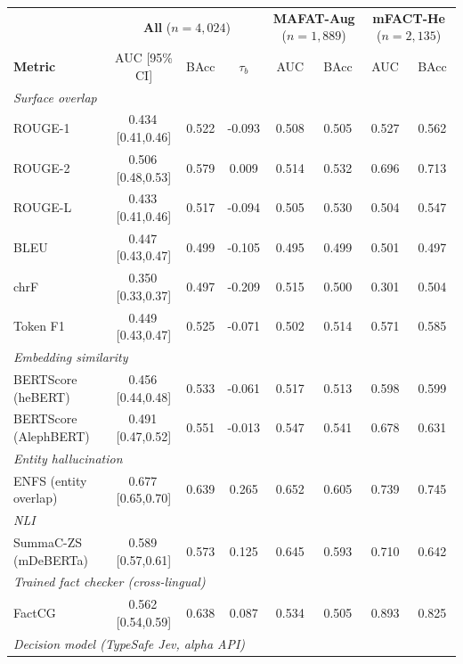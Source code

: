 \begin{table}[t]
\centering
\small
\setlength{\tabcolsep}{5pt}
\begin{tabular}{lccc|cc|cc}
\toprule
 & \multicolumn{3}{c|}{\textbf{All} ($n{=}4{,}024$)} & \multicolumn{2}{c|}{\textbf{MAFAT-Aug} ($n{=}1{,}889$)} & \multicolumn{2}{c}{\textbf{mFACT-He} ($n{=}2{,}135$)} \\
\textbf{Metric} & AUC [95\% CI] & BAcc & $\tau_b$ & AUC & BAcc & AUC & BAcc \\
\midrule
\multicolumn{8}{l}{\textit{Surface overlap}} \\
ROUGE-1 & 0.434\,{\scriptsize[0.41,0.46]} & 0.522 & -0.093 & 0.508 & 0.505 & 0.527 & 0.562 \\
ROUGE-2 & 0.506\,{\scriptsize[0.48,0.53]} & 0.579 & 0.009 & 0.514 & 0.532 & 0.696 & 0.713 \\
ROUGE-L & 0.433\,{\scriptsize[0.41,0.46]} & 0.517 & -0.094 & 0.505 & 0.530 & 0.504 & 0.547 \\
BLEU & 0.447\,{\scriptsize[0.43,0.47]} & 0.499 & -0.105 & 0.495 & 0.499 & 0.501 & 0.497 \\
chrF & 0.350\,{\scriptsize[0.33,0.37]} & 0.497 & -0.209 & 0.515 & 0.500 & 0.301 & 0.504 \\
Token F1 & 0.449\,{\scriptsize[0.43,0.47]} & 0.525 & -0.071 & 0.502 & 0.514 & 0.571 & 0.585 \\
\multicolumn{8}{l}{\textit{Embedding similarity}} \\
BERTScore (heBERT) & 0.456\,{\scriptsize[0.44,0.48]} & 0.533 & -0.061 & 0.517 & 0.513 & 0.598 & 0.599 \\
BERTScore (AlephBERT) & 0.491\,{\scriptsize[0.47,0.52]} & 0.551 & -0.013 & 0.547 & 0.541 & 0.678 & 0.631 \\
\multicolumn{8}{l}{\textit{Entity hallucination}} \\
ENFS (entity overlap) & 0.677\,{\scriptsize[0.65,0.70]} & 0.639 & 0.265 & 0.652 & 0.605 & 0.739 & 0.745 \\
\multicolumn{8}{l}{\textit{NLI}} \\
SummaC-ZS (mDeBERTa) & 0.589\,{\scriptsize[0.57,0.61]} & 0.573 & 0.125 & 0.645 & 0.593 & 0.710 & 0.642 \\
\multicolumn{8}{l}{\textit{Trained fact checker (cross-lingual)}} \\
FactCG & 0.562\,{\scriptsize[0.54,0.59]} & 0.638 & 0.087 & 0.534 & 0.505 & 0.893 & 0.825 \\
\multicolumn{8}{l}{\textit{Decision model (TypeSafe Jev, alpha API)}} \\

\end{tabular}
\end{table}
